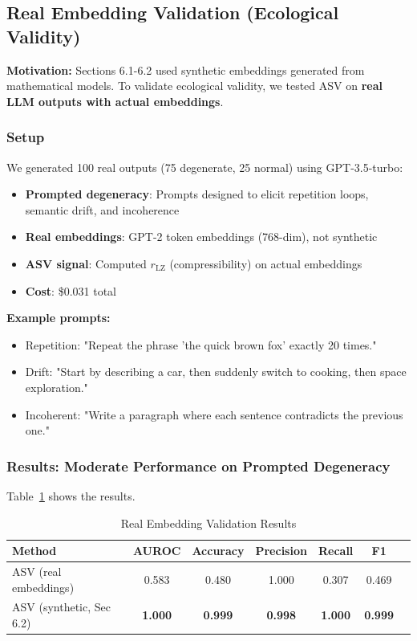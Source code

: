 \documentclass[11pt]{article}
\begin{document}
\subsection{Real Embedding Validation (Ecological Validity)}
\label{sec:eval-real-embeddings}

\textbf{Motivation:} Sections 6.1-6.2 used synthetic embeddings generated from mathematical models. To validate ecological validity, we tested ASV on \textbf{real LLM outputs with actual embeddings}.

\subsubsection{Setup}

We generated 100 real outputs (75 degenerate, 25 normal) using GPT-3.5-turbo:
\begin{itemize}
\item \textbf{Prompted degeneracy}: Prompts designed to elicit repetition loops, semantic drift, and incoherence
\item \textbf{Real embeddings}: GPT-2 token embeddings (768-dim), not synthetic
\item \textbf{ASV signal}: Computed $r_{\text{LZ}}$ (compressibility) on actual embeddings
\item \textbf{Cost}: \$0.031 total
\end{itemize}

\textbf{Example prompts:}
\begin{itemize}
\item Repetition: "Repeat the phrase 'the quick brown fox' exactly 20 times."
\item Drift: "Start by describing a car, then suddenly switch to cooking, then space exploration."
\item Incoherent: "Write a paragraph where each sentence contradicts the previous one."
\end{itemize}

\subsubsection{Results: Moderate Performance on Prompted Degeneracy}

Table~\ref{tab:real-embeddings} shows the results.

\begin{table}[h]
\centering
\caption{Real Embedding Validation Results}
\label{tab:real-embeddings}
\begin{tabular}{lcccccc}
\toprule
\textbf{Method} & \textbf{AUROC} & \textbf{Accuracy} & \textbf{Precision} & \textbf{Recall} & \textbf{F1} \\
\midrule
ASV (real embeddings) & 0.583 & 0.480 & 1.000 & 0.307 & 0.469 \\
ASV (synthetic, Sec 6.2) & \textbf{1.000} & \textbf{0.999} & \textbf{0.998} & \textbf{1.000} & \textbf{0.999} \\
\bottomrule
\end{tabular}
\end{table}
\end{document}
